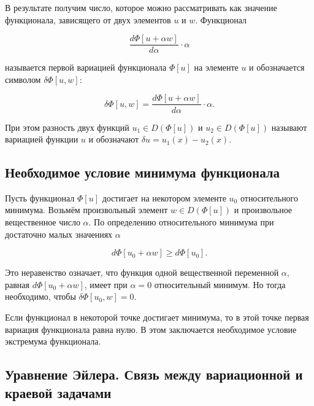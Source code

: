 \documentclass{article}
\begin{document}
\noindent В результате получим число, которое можно рассматривать как значение функционала, зависящего от двух элементов $u$ и $w$. Функционал

\begin{displaymath}
    \frac{d\Phi[u + \alpha w]}{d\alpha} \cdot \alpha
\end{displaymath}

\noindent называется первой вариацией функционала $\Phi[u]$ на элементе $u$ и обозначается символом $\delta \Phi[u, w]$:

\begin{displaymath}
     \delta \Phi[u, w] = \frac{d\Phi[u + \alpha w]}{d\alpha} \cdot \alpha.
\end{displaymath}

\noindent При этом разность двух функций $u_{1} \in D(\Phi[u])$ и $u_{2} \in D(\Phi[u])$ называют вариацией функции $u$ и обозначают $\delta u = u_{1}(x) - u_{2}(x)$.


\subsection{Необходимое условие минимума функционала}\label{sub_section_minimum_conditions}

Пусть функционал $\Phi[u]$ достигает на некотором элементе $u_{0}$ относительного минимума. Возьмём произвольный элемент $w \in D(\Phi[u])$ и произвольное вещественное число $\alpha$. 
По определению относительного минимума при достаточно малых значениях $\alpha$

\begin{displaymath}
     d\Phi[u_{0} + \alpha w] \geq d\Phi[u_{0}].
\end{displaymath}

\noindent Это неравенство означает, что функция одной вещественной переменной $\alpha$, равная $d\Phi[u_{0} + \alpha w]$, имеет при $\alpha = 0$ относительный минимум. 
Но тогда необходимо, чтобы  $\delta \Phi[u_{0}, w] = 0$.

\begin{warn}[Важно!]
	Если функционал в некоторой точке достигает минимума, то в этой точке первая вариация функционала равна нулю. В этом заключается необходимое условие экстремума функционала.
\end{warn}


\subsection{Уравнение Эйлера. Связь между вариационной и краевой задачами}
\end{document}
